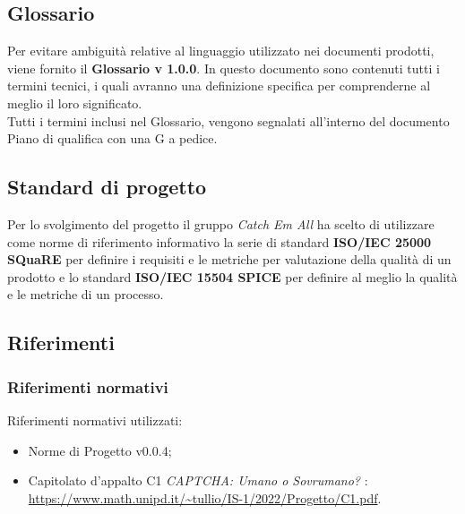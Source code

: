 \subsection{Glossario}
Per evitare ambiguità relative al linguaggio utilizzato nei documenti prodotti, viene fornito il \textbf{Glossario v 1.0.0}. In questo documento sono contenuti tutti i termini tecnici, i quali avranno una definizione specifica per comprenderne al meglio il loro significato.\\
Tutti i termini inclusi nel Glossario, vengono segnalati all'interno del documento Piano di qualifica con una G a pedice.


\subsection{Standard di progetto}
Per lo svolgimento del progetto il gruppo \textit{Catch Em All} ha scelto di utilizzare come norme di riferimento informativo la serie di standard \textbf{ISO/IEC 25000 SQuaRE} per definire i requisiti e le metriche per valutazione della qualità di un prodotto e lo standard \textbf{ISO/IEC 15504 SPICE} per definire al meglio la qualità e le metriche di un processo.

\subsection{Riferimenti}
\subsubsection{Riferimenti normativi}
Riferimenti normativi utilizzati:
\begin{itemize}
	\item Norme di Progetto v0.0.4;
	\item Capitolato d'appalto C1 \textit{CAPTCHA: Umano o Sovrumano?} : \\
		\url{https://www.math.unipd.it/~tullio/IS-1/2022/Progetto/C1.pdf}.
\end{itemize}
